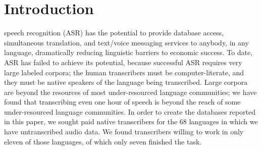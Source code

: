 \section{Introduction}

 speech recognition (ASR) has the potential to provide
database access, simultaneous translation, and text/voice messaging
services to anybody, in any language, dramatically reducing linguistic
barriers to economic success.  To date, ASR has failed to achieve its
potential, because successful ASR requires very large labeled
corpora;
the human transcribers must be computer-literate, and
they must be native speakers of the language being transcribed.
{\color{blue} Large corpora are beyond the resources of most
  under-resourced language communities; we have found that
  transcribing even one hour of speech is beyond the reach of some
  under-resourced language communities.  In order to create the
  databases reported in this paper, we sought paid native transcribers
  for the 68 languages in which we have untranscribed audio data.
  We found transcribers willing to work in only eleven of those
  languages, of which only seven finished the task.}

